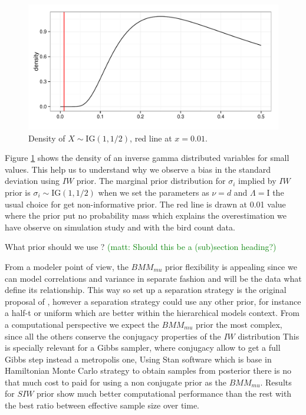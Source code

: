 \documentclass[a4paper]{article}
\newcommand{\matt}[1]{\textcolor{green}{(matt: #1)}}
\newcommand{\I}{\mathrm{I}}
\begin{document}
\begin{figure}[hbpt]
\centering
\includegraphics[width=\textwidth]{ig}
 \vspace{-.5in}
\caption{Density of $X\sim \mbox{IG}(1, 1/2)$, red line at $x=0.01$. \label{igamma} }
\end{figure}

Figure \ref{igamma} shows the density of an inverse gamma distributed variables for small values. This help us to understand why we observe a bias in the standard deviation using $IW$ prior. The marginal prior distribution for $\sigma_i$ implied by $IW$ prior is $\sigma_i \sim \mbox{IG}(1, 1/2)$ when we set the parameters as $\nu = d$ and $\Lambda=\I$ the usual choice for get non-informative prior. The red line is drawn at 0.01 value where the prior put no probability mass which explains the overestimation we have observe on simulation study and with the bird count data. 

 What prior should we use ? \matt{Should this be a (sub)section heading?}

From a modeler point of view, the $BMM_{mu}$ prior flexibility is appealing since we can model correlations and variance in separate fashion and will be the data what define its relationship.  This way so set up a separation strategy is the original proposal of \cite{barnard2000}, however a separation strategy could use any other prior, for instance a half-t or uniform which are better within the hierarchical models context.  From a computational perspective we expect the $BMM_{mu}$ prior the most complex, since all the others conserve the conjugacy properties of the $IW$ distribution This is specially relevant for a Gibbs sampler, where conjugacy allow to get a full Gibbs step instead a metropolis one, Using Stan software which is base in Hamiltonian Monte Carlo strategy to obtain samples from posterior there is no that much cost to paid for using a non conjugate prior as the $BMM_{mu}$.  Results for $SIW$ prior show much better computational performance than the rest with the best ratio between effective sample size over time.  
\end{document}
